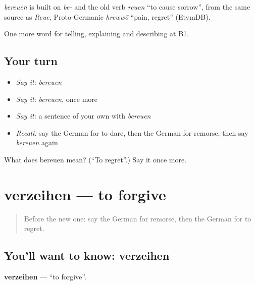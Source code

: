 \begin{cousinweb}
\emph{bereuen} is built on \emph{be-} and the old verb \emph{reuen} \textquotedblleft{}to cause sorrow\textquotedblright{}, from the same source as \emph{Reue}, Proto-Germanic \emph{hrewwō} \textquotedblleft{}pain, regret\textquotedblright{} (EtymDB).
\end{cousinweb}

\begin{grammarlens}[title={What you've built}]
One more word for telling, explaining and describing at B1.
\end{grammarlens}

\subsection*{Your turn}
\begin{itemize}
\raggedright
  \item \emph{Say it:} \emph{bereuen}
  \item \emph{Say it:} \emph{bereuen}, once more
  \item \emph{Say it:} a sentence of your own with \emph{bereuen}
  \item \emph{Recall:} say the German for to dare, then the German for remorse, then say \emph{bereuen} again
\end{itemize}

\begin{tcolorbox}[breakable,colback=teal!4,colframe=teal!35!black,title={Before you move on}]
What does bereuen mean? (\textquotedblleft{}To regret\textquotedblright{}.) Say it once more.
\end{tcolorbox}
\section[verzeihen]{verzeihen — to forgive}

\label{lesson:GE-C478-verzeihen}



\begin{quote}
Before the new one: say the German for remorse, then the German for to regret.
\end{quote}

\subsection*{You'll want to know: verzeihen}
\textbf{verzeihen} — \textquotedblleft{}to forgive\textquotedblright{}.

